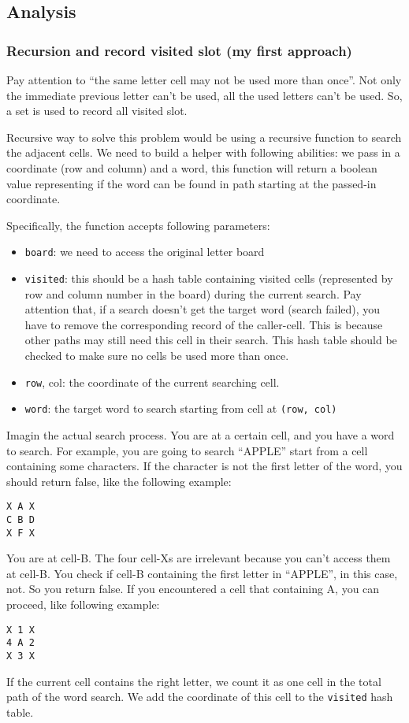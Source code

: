 \documentclass[11pt]{article}
\begin{document}
\subsection{Analysis}
\label{sec:org8df2802}
\subsubsection{Recursion and record visited slot (my first approach)}
\label{sec:orgd253ea9}
Pay attention to ``the same letter cell may not be used more than once''. Not only the immediate previous letter can't be used, all the used letters can't be used. So, a set is used to record all visited slot.

Recursive way to solve this problem would be using a recursive function to search the adjacent cells. We need to build a helper with following abilities: we pass in a coordinate (row and column) and a word, this function will return a boolean value representing if the word can be found in path starting at the passed-in coordinate.

Specifically, the function accepts following parameters:
\begin{itemize}
\item \texttt{board}: we need to access the original letter board
\item \texttt{visited}: this should be a hash table containing visited cells (represented by row and column number in the board) during the current search. Pay attention that, if a search doesn't get the target word (search failed), you have to remove the corresponding record of the caller-cell. This is because other paths may still need this cell in their search. This hash table should be checked to make sure no cells be used more than once.
\item \texttt{row}, col: the coordinate of the current searching cell.
\item \texttt{word}: the target word to search starting from cell at \texttt{(row, col)}
\end{itemize}

Imagin the actual search process. You are at a certain cell, and you have a word to search. For example, you are going to search ``APPLE'' start from a cell containing some characters. If the character is not the first letter of the word, you should return false, like the following example:
\begin{Verbatim}[frame=single]
X A X
C B D
X F X
\end{Verbatim}
You are at cell-B. The four cell-Xs are irrelevant because you can't access them at cell-B. You check if cell-B containing the first letter in ``APPLE'', in this case, not. So you return false. If you encountered a cell that containing A, you can proceed, like following example:
\begin{Verbatim}[frame=single]
X 1 X
4 A 2
X 3 X
\end{Verbatim}
If the current cell contains the right letter, we count it as one cell in the total path of the word search. We add the coordinate of this cell to the \texttt{visited} hash table. 
\end{document}
